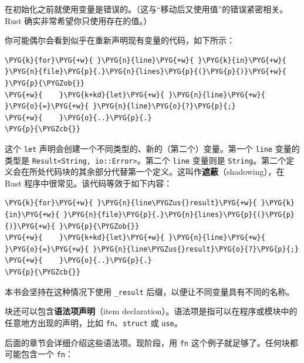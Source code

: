 在初始化之前就使用变量是错误的。（这与“移动后又使用值”的错误紧密相关。Rust 确实非常希望你只使用存在的值。）

你可能偶尔会看到似乎在重新声明现有变量的代码，如下所示：

\begin{Verbatim}[commandchars=\\\{\},breaklines=true,breakanywhere=true,fontsize=\codefont,xleftmargin=17bp]
\PYG{k}{for}\PYG{+w}{ }\PYG{n}{line}\PYG{+w}{ }\PYG{k}{in}\PYG{+w}{ }\PYG{n}{file}\PYG{p}{.}\PYG{n}{lines}\PYG{p}{(}\PYG{p}{)}\PYG{+w}{ }\PYG{p}{\PYGZob{}}
\PYG{+w}{    }\PYG{k+kd}{let}\PYG{+w}{ }\PYG{n}{line}\PYG{+w}{ }\PYG{o}{=}\PYG{+w}{ }\PYG{n}{line}\PYG{o}{?}\PYG{p}{;}
\PYG{+w}{    }\PYG{o}{..}\PYG{p}{.}
\PYG{p}{\PYGZcb{}}
\end{Verbatim}

这个 \texttt{let} 声明会创建一个不同类型的、新的（第二个）变量。第一个 \texttt{line} 变量的类型是 \texttt{Result<String, io::Error>}。第二个 \texttt{line} 变量则是 \texttt{String}。第二个定义会在所处代码块的其余部分代替第一个定义。这叫作\textbf{遮蔽}（shadowing），在 Rust 程序中很常见。该代码等效于如下内容：

\begin{Verbatim}[commandchars=\\\{\},breaklines=true,breakanywhere=true,fontsize=\codefont,xleftmargin=17bp]
\PYG{k}{for}\PYG{+w}{ }\PYG{n}{line\PYGZus{}result}\PYG{+w}{ }\PYG{k}{in}\PYG{+w}{ }\PYG{n}{file}\PYG{p}{.}\PYG{n}{lines}\PYG{p}{(}\PYG{p}{)}\PYG{+w}{ }\PYG{p}{\PYGZob{}}
\PYG{+w}{    }\PYG{k+kd}{let}\PYG{+w}{ }\PYG{n}{line}\PYG{+w}{ }\PYG{o}{=}\PYG{+w}{ }\PYG{n}{line\PYGZus{}result}\PYG{o}{?}\PYG{p}{;}
\PYG{+w}{    }\PYG{o}{..}\PYG{p}{.}
\PYG{p}{\PYGZcb{}}
\end{Verbatim}

本书会坚持在这种情况下使用 \texttt{\_result} 后缀，以便让不同变量具有不同的名称。

块还可以包含\textbf{语法项声明}（item declaration）。语法项是指可以在程序或模块中的任意地方出现的声明，比如 \texttt{fn}、\texttt{struct} 或 \texttt{use}。

后面的章节会详细介绍这些语法项。现阶段，用 \texttt{fn} 这个例子就足够了。任何块都可能包含一个 \texttt{fn}：

